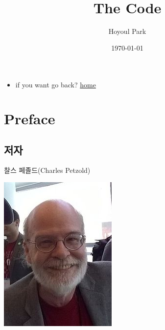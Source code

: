 \documentclass[11pt]{article}
\author{Hoyoul Park}
\date{\today}
\title{The Code}
\begin{document}
\maketitle
\tableofcontents

\begin{itemize}
\item if you want go back?  \href{http://www.holytofrege.space/index.html}{home}
\end{itemize}
\section{Preface}
\label{sec:orge604fa1}
\subsection{저자}
\label{sec:orgbed19d4}
찰스 페졸드(Charles Petzold)
\begin{center}
\begin{center}
\includegraphics[width=.9\linewidth]{./img/charles.jpg}
\end{center}   
\end{center}
\end{document}

